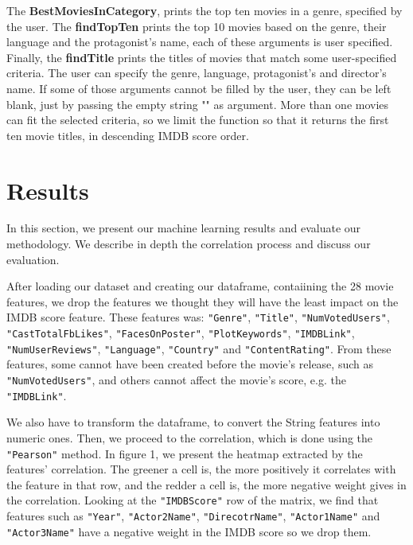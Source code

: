 \documentclass[letterpaper,twocolumn,10pt]{article}
\begin{document}
The \textbf{BestMoviesInCategory}, prints the top ten movies in a genre, specified by the user. The \textbf{findTopTen} prints the top 10 movies based on the genre, their language and the protagonist's name, each of these arguments is user specified. Finally, the \textbf{findTitle} prints the titles of movies that match some user-specified criteria. The user can specify the genre, language, protagonist's and director's name. If some of those arguments cannot be filled by the user, they can be left blank, just by passing the empty string "" as argument. More than one movies can fit the selected criteria, so we limit the function so that it returns the first ten movie titles, in descending IMDB score order. \par

\section{Results}
In this section, we present our machine learning results and evaluate our methodology. We describe in depth the correlation process and discuss our evaluation.\par
After loading our dataset and creating our dataframe, contaiining the 28 movie features, we drop the features we thought they will have the least impact on the IMDB score feature. These features was: \texttt{"Genre"}, \texttt{"Title"}, \texttt{"NumVotedUsers"}, \texttt{"CastTotalFbLikes"}, \texttt{"FacesOnPoster"}, \texttt{"PlotKeywords"}, \texttt{"IMDBLink"}, \texttt{"NumUserReviews"}, \texttt{"Language"}, \texttt{"Country"} and \texttt{"ContentRating"}. From these features, some cannot have been created before the movie's release, such as \texttt{"NumVotedUsers"}, and others cannot affect the movie's score, e.g. the \texttt{"IMDBLink"}.\par 

We also have to transform the dataframe, to convert the String features into numeric ones. Then, we proceed to the correlation, which is done using the \texttt{"Pearson"} method. In figure 1, we present the heatmap extracted by the features' correlation. The greener a cell is, the more positively it correlates with the feature in that row, and the redder a cell is, the more negative weight gives in the correlation. Looking at the \texttt{"IMDBScore"} row of the matrix, we find that features such as \texttt{"Year"}, \texttt{"Actor2Name"}, \texttt{"DirecotrName"}, \texttt{"Actor1Name"} and \texttt{"Actor3Name"} have a negative weight in the IMDB score so we drop them.
\end{document}
